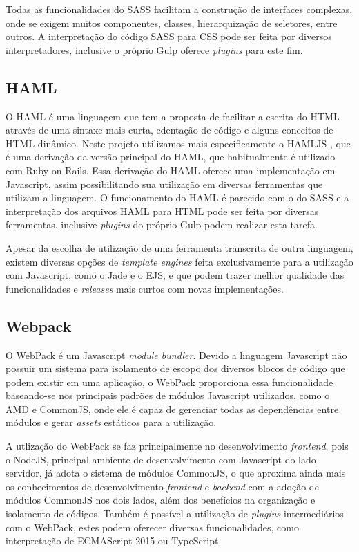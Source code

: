 Todas as funcionalidades do SASS facilitam a construção de interfaces complexas, onde se exigem muitos componentes, classes, hierarquização de seletores, entre outros. A interpretação do código SASS para CSS pode ser feita por diversos interpretadores, inclusive o próprio Gulp oferece \textit{plugins} para este fim.

\subsection{HAML}
O HAML \cite{haml} é uma linguagem que tem a proposta de facilitar a escrita do HTML através de uma sintaxe mais curta, edentação de código e alguns conceitos de HTML dinâmico. Neste projeto utilizamos mais especificamente o HAMLJS \cite{hamljs}, que é uma derivação da versão principal do HAML, que habitualmente é utilizado com Ruby on Rails. Essa derivação do HAML oferece uma implementação em Javascript, assim possibilitando sua utilização em diversas ferramentas que utilizam a linguagem. O funcionamento do HAML é parecido com o do SASS e a interpretação dos arquivos HAML para HTML pode ser feita por diversas ferramentas, inclusive \textit{plugins} do próprio Gulp podem realizar esta tarefa.

Apesar da escolha de utilização de uma ferramenta transcrita de outra linguagem, existem diversas opções de \textit{template engines} feita exclusivamente para a utilização com Javascript, como o Jade e o EJS, e que podem trazer melhor qualidade das funcionalidades e \textit{releases} mais curtos com novas implementações.

\subsection{Webpack}
O WebPack \cite{webpack} é um Javascript \textit{module bundler}. Devido a linguagem Javascript não possuir um sistema para isolamento de escopo dos diversos blocos de código que podem existir em uma aplicação, o WebPack proporciona essa funcionalidade baseando-se nos principais padrões de módulos Javascript utilizados, como o AMD e CommonJS, onde ele é capaz de gerenciar todas as dependências entre módulos e gerar \textit{assets} estáticos para a utilização.

A utlização do WebPack se faz principalmente no desenvolvimento \textit{frontend}, pois o NodeJS, principal ambiente de desenvolvimento com Javascript do lado servidor, já adota o sistema de módulos CommonJS, o que aproxima ainda mais os conhecimentos de desenvolvimento \textit{frontend} e \textit{backend} com a adoção de módulos CommonJS nos dois lados, além dos benefícios na organização e isolamento de códigos. Também é possível a utilização de \textit{plugins} intermediários com o WebPack, estes podem oferecer diversas funcionalidades, como interpretação de ECMAScript 2015 ou TypeScript.

